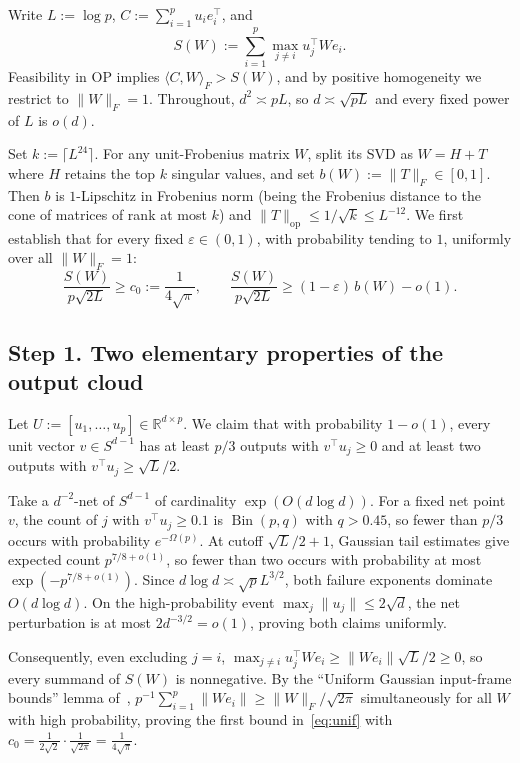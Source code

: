 \documentclass[11pt]{article}
\theoremstyle{plain}
\theoremstyle{definition}
\theoremstyle{remark}
\DeclareMathOperator{\Bin}{Bin}
\begin{document}
Write $L := \log p$, $C := \sum_{i=1}^p u_i e_i^\top$, and
\[
S(W) := \sum_{i=1}^p \max_{j \neq i} u_j^\top W e_i.
\]
Feasibility in \textup{OP} implies $\langle C, W \rangle_F > S(W)$, and by positive homogeneity we restrict to $\|W\|_F = 1$. Throughout, $d^2 \asymp p L$, so $d \asymp \sqrt{p L}$ and every fixed power of $L$ is $o(d)$.

Set $k := \lceil L^{24} \rceil$. For any unit-Frobenius matrix $W$, split its SVD as $W = H + T$ where $H$ retains the top $k$ singular values, and set $b(W) := \|T\|_F \in [0, 1]$. Then $b$ is $1$-Lipschitz in Frobenius norm (being the Frobenius distance to the cone of matrices of rank at most $k$) and $\|T\|_{\mathrm{op}} \le 1/\sqrt{k} \le L^{-12}$.
We first establish that for every fixed $\varepsilon \in (0, 1)$, with probability tending to $1$, uniformly over all $\|W\|_F = 1$:
\begin{equation}\label{eq:unif}
\frac{S(W)}{p\sqrt{2L}} \ge c_0 := \frac{1}{4\sqrt{\pi}},
\qquad
\frac{S(W)}{p\sqrt{2L}} \ge (1 - \varepsilon)\, b(W) - o(1).
\end{equation}

\subsection*{Step 1. Two elementary properties of the output cloud}

Let $U := [u_1, \dots, u_p] \in \mathbb{R}^{d \times p}$. We claim that with probability $1 - o(1)$, every unit vector $v \in S^{d-1}$ has at least $p/3$ outputs with $v^\top u_j \ge 0$ and at least two outputs with $v^\top u_j \ge \sqrt{L}/2$.

Take a $d^{-2}$-net of $S^{d-1}$ of cardinality $\exp(O(d \log d))$. For a fixed net point $v$, the count of $j$ with $v^\top u_j \ge 0.1$ is $\Bin(p, q)$ with $q > 0.45$, so fewer than $p/3$ occurs with probability $e^{-\Omega(p)}$. At cutoff $\sqrt{L}/2 + 1$, Gaussian tail estimates give expected count $p^{7/8 + o(1)}$, so fewer than two occurs with probability at most $\exp(-p^{7/8 + o(1)})$. Since $d \log d \asymp \sqrt{p} L^{3/2}$, both failure exponents dominate $O(d \log d)$. On the high-probability event $\max_j \|u_j\| \le 2\sqrt{d}$, the net perturbation is at most $2 d^{-3/2} = o(1)$, proving both claims uniformly.

Consequently, even excluding $j = i$, $\max_{j \neq i} u_j^\top W e_i \ge \|W e_i\|\sqrt{L}/2 \ge 0$, so every summand of $S(W)$ is nonnegative. By the ``Uniform Gaussian input-frame bounds'' lemma of~\cite{giorlandino2026}, $p^{-1}\sum_{i=1}^p \|W e_i\| \ge \|W\|_F / \sqrt{2\pi}$ simultaneously for all $W$ with high probability, proving the first bound in~\eqref{eq:unif} with $c_0 = \frac{1}{2\sqrt{2}} \cdot \frac{1}{\sqrt{2\pi}} = \frac{1}{4\sqrt{\pi}}$.
\end{document}
